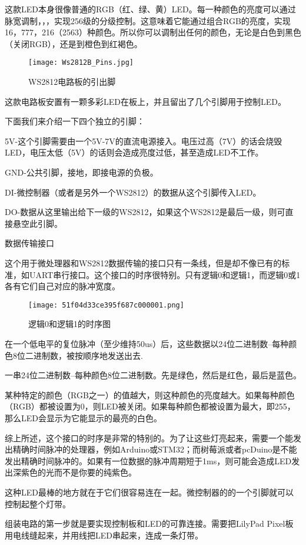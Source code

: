 这款LED本身很像普通的RGB（红、绿、黄）LED。每一种颜色的亮度可以通过脉宽调制，，，实现256级的分级控制。这意味着它能通过组合RGB的亮度，实现16，777，216（2563）种颜色。所以你可以调制出任何的颜色，无论是白色到黑色（关闭RGB），还是到橙色到红褐色。
\begin{figure}[htbp]
\centering
\texttt{[image: Ws2812B\_Pins.jpg]}
\caption{WS2812电路板的引出脚} 
\label{WSq}
\end{figure}

这款电路板安置有一颗多彩LED在板上，并且留出了几个引脚用于控制LED。

下面我们来介绍一下四个独立的引脚：

5V-这个引脚需要由一个5V-7V的直流电源接入。电压过高（7V）的话会烧毁LED，电压太低（5V）的话则会造成亮度过低，甚至造成LED不工作。

GND-公共引脚，接地，即接电源的负极。

DI-微控制器（或者是另外一个WS2812）的数据从这个引脚传入LED。

DO-数据从这里输出给下一级的WS2812，如果这个WS2812是最后一级，则可直接悬空此引脚。

数据传输接口

这个用于微处理器和WS2812数据传输的接口只有一条线，但是却不像已有的标准，如UART串行接口。这个接口的时序很特别。只有逻辑0和逻辑1，而逻辑0或1各有它们自己对应的脉冲宽度。

\begin{figure}[htbp]
\centering
\texttt{[image: 51f04d33ce395f687c000001.png]}
\caption{逻辑0和逻辑1的时序图} 
\label{WS01}
\end{figure}

在一个低电平的复位脉冲（至少维持50us）后，这些数据以24位二进制数–每种颜色8位二进制数，被按顺序地发送出去.

一串24位二进制数–每种颜色8位二进制数。先是绿色，然后是红色，最后是蓝色。

某种特定的颜色（RGB之一）的值越大，则这种颜色的亮度越大。如果每种颜色（RGB）都被设置为0，则LED被关闭。如果每种颜色都被设置为最大，即255，那么LED会显示为它能显示的最亮的白色。

综上所述，这个接口的时序是非常的特别的。为了让这些灯亮起来，需要一个能发出精确时间脉冲的处理器，例如Arduino或STM32；而树莓派或者pcDuino是不能发出精确时间脉冲的。如果有一位数据的脉冲周期短于1ms，则可能会造成LED发出深紫色的光而不是你要的纯紫色。

这种LED最棒的地方就在于它们很容易连在一起。微控制器的的一个引脚就可以控制起整个灯带。

组装电路的第一步就是要实现控制板和LED的可靠连接。需要把LilyPad Pixel板用电线缝起来，并用线把LED串起来，连成一条灯带。

